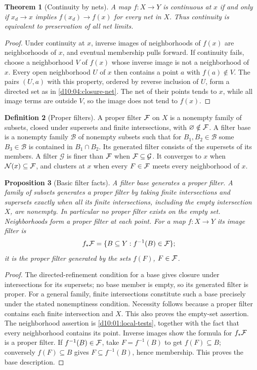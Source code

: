 \documentclass[11pt,oneside,openany]{book}
\newtheorem{theorem}{Theorem}[chapter]
\newtheorem{proposition}[theorem]{Proposition}
\theoremstyle{definition}
\newtheorem{definition}[theorem]{Definition}
\theoremstyle{remark}
\begin{document}
\begin{theorem}[Continuity by nets]\label{d10:04:continuity-net}
A map $f:X\to Y$ is continuous at $x$ if and only if $x_d\to x$ implies $f(x_d)\to f(x)$ for every net in $X$. Thus continuity is equivalent to preservation of all net limits.
\end{theorem}
\begin{proof}
Under continuity at $x$, inverse images of neighborhoods of $f(x)$ are neighborhoods of $x$, and eventual membership pulls forward. If continuity fails, choose a neighborhood $V$ of $f(x)$ whose inverse image is not a neighborhood of $x$. Every open neighborhood $U$ of $x$ then contains a point $a$ with $f(a)\notin V$. The pairs $(U,a)$ with this property, ordered by reverse inclusion of $U$, form a directed set as in \cref{d10:04:closure-net}. The net of their points tends to $x$, while all image terms are outside $V$, so the image does not tend to $f(x)$.
\end{proof}

\begin{definition}[Proper filters]\label{d10:04:filters}
A proper filter $\mathcal F$ on $X$ is a nonempty family of subsets, closed under supersets and finite intersections, with $\varnothing\notin\mathcal F$. A filter base is a nonempty family $\mathcal B$ of nonempty subsets such that for $B_1,B_2\in\mathcal B$ some $B_3\in\mathcal B$ is contained in $B_1\cap B_2$. Its generated filter consists of the supersets of its members. A filter $\mathcal G$ is finer than $\mathcal F$ when $\mathcal F\subseteq\mathcal G$. It converges to $x$ when $\mathcal N(x)\subseteq\mathcal F$, and clusters at $x$ when every $F\in\mathcal F$ meets every neighborhood of $x$.
\end{definition}

\begin{proposition}[Basic filter facts]\label{d10:04:filter-facts}
A filter base generates a proper filter. A family of subsets generates a proper filter by taking finite intersections and supersets exactly when all its finite intersections, including the empty intersection $X$, are nonempty. In particular no proper filter exists on the empty set. Neighborhoods form a proper filter at each point. For a map $f:X\to Y$ its image filter is
\[
 f_*\mathcal F=\{B\subseteq Y:f^{-1}(B)\in\mathcal F\};
\]
it is the proper filter generated by the sets $f(F)$, $F\in\mathcal F$.
\end{proposition}
\begin{proof}
The directed-refinement condition for a base gives closure under intersections for its supersets; no base member is empty, so its generated filter is proper. For a general family, finite intersections constitute such a base precisely under the stated nonemptiness condition. Necessity follows because a proper filter contains each finite intersection and $X$. This also proves the empty-set assertion. The neighborhood assertion is \cref{d10:01:local-tests}, together with the fact that every neighborhood contains its point. Inverse images show the formula for $f_*\mathcal F$ is a proper filter. If $f^{-1}(B)\in\mathcal F$, take $F=f^{-1}(B)$ to get $f(F)\subseteq B$; conversely $f(F)\subseteq B$ gives $F\subseteq f^{-1}(B)$, hence membership. This proves the base description.
\end{proof}
\end{document}
